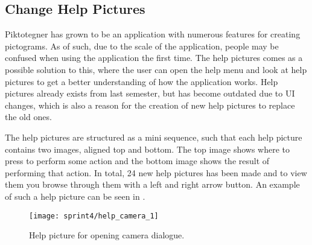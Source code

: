 \subsection*{Change Help Pictures}
Piktotegner has grown to be an application with numerous features for creating pictograms.
As of such, due to the scale of the application, people may be confused when using the application the first time.
The help pictures comes as a possible solution to this, where the user can open the help menu and look at help pictures to get a better understanding of how the application works.
Help pictures already exists from last semester, but has become outdated due to UI changes, which is also a reason for the creation of new help pictures to replace the old ones.

The help pictures are structured as a mini sequence, such that each help picture contains two images, aligned top and bottom.
The top image shows where to press to perform some action and the bottom image shows the result of performing that action.
In total, 24 new help pictures has been made and to view them you browse through them with a left and right arrow button.
An example of such a help picture can be seen in .

\begin{figure}[h]
     \centering
     \texttt{[image: sprint4/help\_camera\_1]}
     \caption{Help picture for opening camera dialogue.}
     \label{fig:helpCamera}
\end{figure}


